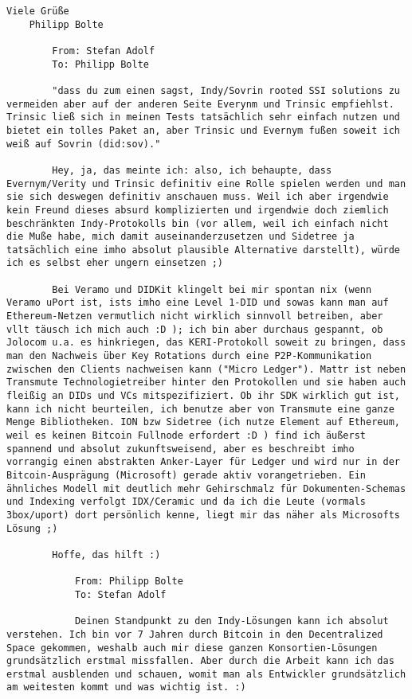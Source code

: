 \begin{Verbatim}[breaklines=true, breaksymbol={}, breaksymbolsepleftnchars=2]
    Viele Grüße
    Philipp Bolte

        From: Stefan Adolf
        To: Philipp Bolte
        
        "dass du zum einen sagst, Indy/Sovrin rooted SSI solutions zu vermeiden aber auf der anderen Seite Everynm und Trinsic empfiehlst. Trinsic ließ sich in meinen Tests tatsächlich sehr einfach nutzen und bietet ein tolles Paket an, aber Trinsic und Evernym fußen soweit ich weiß auf Sovrin (did:sov)."

        Hey, ja, das meinte ich: also, ich behaupte, dass Evernym/Verity und Trinsic definitiv eine Rolle spielen werden und man sie sich deswegen definitiv anschauen muss. Weil ich aber irgendwie kein Freund dieses absurd komplizierten und irgendwie doch ziemlich beschränkten Indy-Protokolls bin (vor allem, weil ich einfach nicht die Muße habe, mich damit auseinanderzusetzen und Sidetree ja tatsächlich eine imho absolut plausible Alternative darstellt), würde ich es selbst eher ungern einsetzen ;)
        
        Bei Veramo und DIDKit klingelt bei mir spontan nix (wenn Veramo uPort ist, ists imho eine Level 1-DID und sowas kann man auf Ethereum-Netzen vermutlich nicht wirklich sinnvoll betreiben, aber vllt täusch ich mich auch :D ); ich bin aber durchaus gespannt, ob Jolocom u.a. es hinkriegen, das KERI-Protokoll soweit zu bringen, dass man den Nachweis über Key Rotations durch eine P2P-Kommunikation zwischen den Clients nachweisen kann ("Micro Ledger"). Mattr ist neben Transmute Technologietreiber hinter den Protokollen und sie haben auch fleißig an DIDs und VCs mitspezifiziert. Ob ihr SDK wirklich gut ist, kann ich nicht beurteilen, ich benutze aber von Transmute eine ganze Menge Bibliotheken. ION bzw Sidetree (ich nutze Element auf Ethereum, weil es keinen Bitcoin Fullnode erfordert :D ) find ich äußerst spannend und absolut zukunftsweisend, aber es beschreibt imho vorrangig einen abstrakten Anker-Layer für Ledger und wird nur in der Bitcoin-Ausprägung (Microsoft) gerade aktiv vorangetrieben. Ein ähnliches Modell mit deutlich mehr Gehirschmalz für Dokumenten-Schemas und Indexing verfolgt IDX/Ceramic und da ich die Leute (vormals 3box/uport) dort persönlich kenne, liegt mir das näher als Microsofts Lösung ;)
        
        Hoffe, das hilft :)
        
            From: Philipp Bolte
            To: Stefan Adolf
            
            Deinen Standpunkt zu den Indy-Lösungen kann ich absolut verstehen. Ich bin vor 7 Jahren durch Bitcoin in den Decentralized Space gekommen, weshalb auch mir diese ganzen Konsortien-Lösungen grundsätzlich erstmal missfallen. Aber durch die Arbeit kann ich das erstmal ausblenden und schauen, womit man als Entwickler grundsätzlich am weitesten kommt und was wichtig ist. :)


\end{Verbatim}
